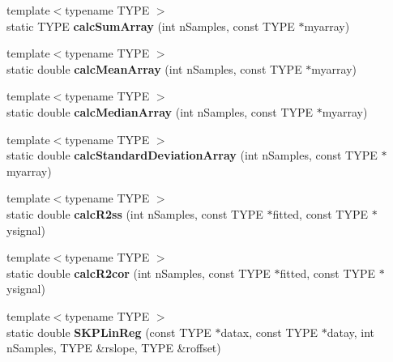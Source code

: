 \begin{DoxyCompactItemize}
{\footnotesize template$<$typename T\+Y\+PE $>$ }\\static T\+Y\+PE {\bfseries calc\+Sum\+Array} (int n\+Samples, const T\+Y\+PE $\ast$myarray)
\item 
\mbox{\label{class_k_w_util_ad9cb19db7d541d5ca5a60c6a28b922e1}} 
{\footnotesize template$<$typename T\+Y\+PE $>$ }\\static double {\bfseries calc\+Mean\+Array} (int n\+Samples, const T\+Y\+PE $\ast$myarray)
\item 
\mbox{\label{class_k_w_util_a6c10285ae2d87ccda6ddaa18c81dea39}} 
{\footnotesize template$<$typename T\+Y\+PE $>$ }\\static double {\bfseries calc\+Median\+Array} (int n\+Samples, const T\+Y\+PE $\ast$myarray)
\item 
\mbox{\label{class_k_w_util_ad9d38c641f6b227be4418acf404170d4}} 
{\footnotesize template$<$typename T\+Y\+PE $>$ }\\static double {\bfseries calc\+Standard\+Deviation\+Array} (int n\+Samples, const T\+Y\+PE $\ast$myarray)
\item 
\mbox{\label{class_k_w_util_ae26dd38b1c5c823fa37129520bb4cc47}} 
{\footnotesize template$<$typename T\+Y\+PE $>$ }\\static double {\bfseries calc\+R2ss} (int n\+Samples, const T\+Y\+PE $\ast$fitted, const T\+Y\+PE $\ast$ysignal)
\item 
\mbox{\label{class_k_w_util_a9eecfdafa3ae5e493830181fa7ea8fa3}} 
{\footnotesize template$<$typename T\+Y\+PE $>$ }\\static double {\bfseries calc\+R2cor} (int n\+Samples, const T\+Y\+PE $\ast$fitted, const T\+Y\+PE $\ast$ysignal)
\item 
\mbox{\label{class_k_w_util_ac7633e5346a8b4ad6b2d1d960eb22fc9}} 
{\footnotesize template$<$typename T\+Y\+PE $>$ }\\static double {\bfseries S\+K\+P\+Lin\+Reg} (const T\+Y\+PE $\ast$datax, const T\+Y\+PE $\ast$datay, int n\+Samples, T\+Y\+PE \&rslope, T\+Y\+PE \&roffset)
\item 
\mbox{\label{class_k_w_util_adea3028ddaac44e13ab60460b0e50452}} 

\end{DoxyCompactItemize}
